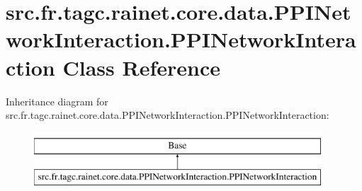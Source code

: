 \hypertarget{classsrc_1_1fr_1_1tagc_1_1rainet_1_1core_1_1data_1_1PPINetworkInteraction_1_1PPINetworkInteraction}{\section{src.\-fr.\-tagc.\-rainet.\-core.\-data.\-P\-P\-I\-Network\-Interaction.\-P\-P\-I\-Network\-Interaction Class Reference}
\label{classsrc_1_1fr_1_1tagc_1_1rainet_1_1core_1_1data_1_1PPINetworkInteraction_1_1PPINetworkInteraction}
}
Inheritance diagram for src.\-fr.\-tagc.\-rainet.\-core.\-data.\-P\-P\-I\-Network\-Interaction.\-P\-P\-I\-Network\-Interaction\-:\begin{figure}[H]
\begin{center}
\leavevmode
\includegraphics[height=2.000000cm]{classsrc_1_1fr_1_1tagc_1_1rainet_1_1core_1_1data_1_1PPINetworkInteraction_1_1PPINetworkInteraction}
\end{center}
\end{figure}
